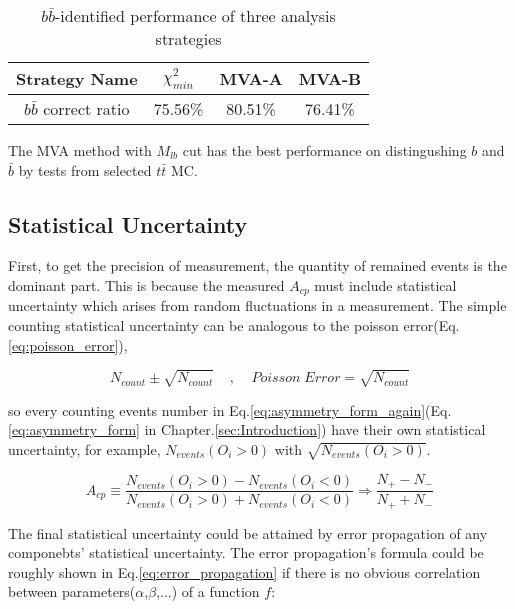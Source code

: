 		\begin{center}
		\setlength{\tabcolsep}{12pt}
		\begin{longtable}{ | c | c c c | }
		\caption{$b\bar{b}$-identified performance of three analysis strategies} \\
		\hline
		Strategy Name & $\chi^2_{min}$ & MVA-A & MVA-B \\ 
		\hline
		$b\bar{b}$ correct ratio & 75.56\% & 80.51\% & 76.41\% \\
		\hline
		\end{longtable}
		\end{center}

		The MVA method with $M_{lb}$ cut has the best performance on distingushing $b$ and $\bar{b}$ by tests from selected $t\bar{t}$ MC.


	\subsection{Statistical Uncertainty}
	\label{ssec:Result_StatErr}
		First, to get the precision of measurement, the quantity of remained events is the dominant part. This is because the measured $A_{cp}$ must include statistical uncertainty which arises from random fluctuations in a measurement. The simple counting statistical uncertainty can be analogous to the poisson error(Eq.\ref{eq:poisson_error}),

		\begin{equation}
		N_{count} \pm \sqrt{N_{count}} \;\;\;\;, \;\;\;\; Poisson\;Error = \sqrt{N_{count}}
		\label{eq:poisson_error}
		\end{equation}
		\FloatBarrier

		so every counting events number in Eq.\ref{eq:asymmetry_form_again}(Eq.\ref{eq:asymmetry_form} in Chapter.\ref{sec:Introduction}) have their own statistical uncertainty, for example, $N_{events}(O_i>0)$ with $\sqrt{N_{events}(O_i>0)}$.

		\begin{equation}
		A_{cp} \equiv \frac{ N_{events}(O_i>0) - N_{events}(O_i<0) }{ N_{events}(O_i>0) + N_{events}(O_i<0) } \Rightarrow \frac{ N_+ - N_- }{ N_+ + N_- }
		\label{eq:asymmetry_form_again}
		\end{equation}
		\FloatBarrier

		The final statistical uncertainty could be attained by error propagation of any componebts' statistical uncertainty. The error propagation's formula could be roughly shown in Eq.\ref{eq:error_propagation} if there is no obvious correlation between parameters($\alpha$,$\beta$,$\ldots$) of a function $f$:

